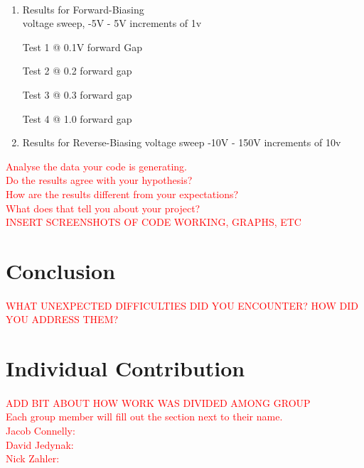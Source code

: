 \documentclass[a4paper]{article}
\begin{document}
\paragraph{}
\begin{enumerate}
\item Results for Forward-Biasing\\
voltage sweep, -5V - 5V
increments of 1v

Test 1 @ 0.1V forward Gap

Test 2 @ 0.2 forward gap

Test 3 @ 0.3 forward gap

Test 4 @ 1.0 forward gap


\item Results for Reverse-Biasing
voltage sweep -10V - 150V
increments of 10v

\end{enumerate}
 \textcolor{red}{Analyse the data your code is generating. 
    \\Do the results agree with your hypothesis? \\
    How are the results different from your expectations?\\
    What does that tell you about your project?}\\
\textcolor{red}{INSERT SCREENSHOTS OF CODE WORKING, GRAPHS, ETC}



\section{Conclusion}
\paragraph{}
\textcolor{red}{WHAT UNEXPECTED DIFFICULTIES DID YOU ENCOUNTER? HOW DID YOU ADDRESS THEM?}

\section{Individual Contribution}
\paragraph{}
 \textcolor{red}{ADD BIT ABOUT HOW WORK WAS DIVIDED AMONG GROUP}\\
 \textcolor{red}{Each group member will fill out the section next to their name.\\
Jacob Connelly:\\
David Jedynak:\\
Nick Zahler:\\}
\end{document}

